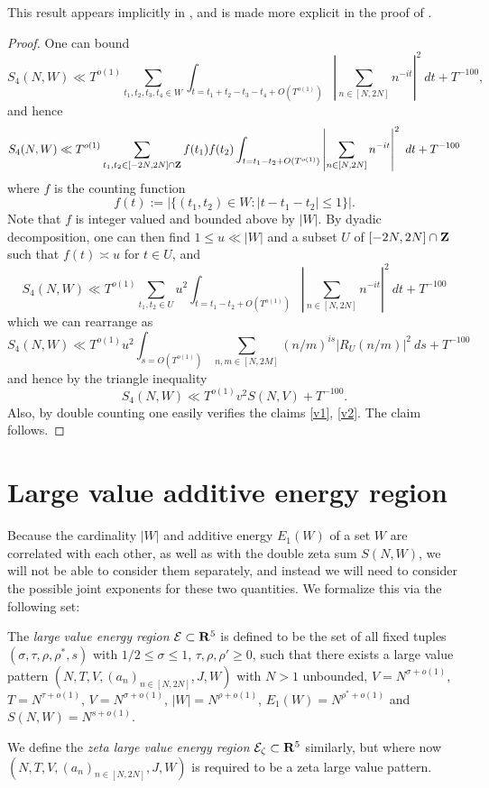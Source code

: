 This result appears implicitly in \cite[p. 229]{heath_brown_consecutive_II}, and is made more explicit in the proof of \cite[Lemma 11.6]{guth-maynard}.

\begin{proof} One can bound
    $$ S_4(N,W) \ll T^{o(1)} \sum_{t_1,t_2,t_3,t_4 \in W} \int_{t = t_1+t_2-t_3-t_4+O(T^{o(1)})} \left|\sum_{n \in [N,2N]} n^{-it}\right|^2\ dt + T^{-100},$$
    and hence
    $$ S_4(N,W) \ll T^{o(1)} \sum_{t_1,t_2 \in [-2N,2N] \cap \mathbf{Z}} f(t_1) f(t_2) \int_{t = t_1-t_2+O(T^{o(1)})} \left|\sum_{n \in [N,2N]} n^{-it}\right|^2\ dt + T^{-100}$$
where $f$ is the counting function
$$ f(t) := |\{ (t_1,t_2) \in W: |t-t_1-t_2| \leq 1 \}|.$$
Note that $f$ is integer valued and bounded above by $|W|$. By dyadic decomposition, one can then find $1 \leq u \ll |W|$ and a subset $U$ of $[-2N,2N] \cap \mathbf{Z}$ such that $f(t) \asymp u$ for $t \in U$, and
$$ S_4(N,W) \ll T^{o(1)} \sum_{t_1,t_2 \in U} u^2 \int_{t = t_1-t_2+O(T^{o(1)})} \left|\sum_{n \in [N,2N]} n^{-it} \right|^2\ dt + T^{-100}$$
which we can rearrange as
$$ S_4(N,W) \ll T^{o(1)} u^2 \int_{s = O(T^{o(1)})} \sum_{n,m \in [N,2M]} (n/m)^{is} |R_U(n/m)|^2\ ds + T^{-100}$$
and hence by the triangle inequality
$$ S_4(N,W) \ll T^{o(1)} v^2 S(N,V) + T^{-100}.$$
Also, by double counting one easily verifies the claims \eqref{v1}, \eqref{v2}.  The claim follows.
\end{proof}


\section{Large value additive energy region}

Because the cardinality $|W|$ and additive energy $E_1(W)$ of a set $W$ are correlated with each other, as well as with the double zeta sum $S(N,W)$, we will not be able to consider them separately, and instead we will need to consider the possible joint exponents for these two quantities.  We formalize this via the following set:

\begin{definition}\label{lv-edef} The \emph{large value energy region} $\mathcal{E} \subset \mathbf{R}^5$ is defined to be the set of all fixed tuples $(\sigma,\tau,\rho,\rho^*,s)$ with $1/2 \leq \sigma \leq 1$, $\tau, \rho, \rho' \geq 0$, such that there exists a large value pattern $(N,T,V,(a_n)_{n \in [N,2N]},J,W)$ with $N>1$ unbounded, $V = N^{\sigma+o(1)}$, $T = N^{\tau+o(1)}$, $V = N^{\sigma+o(1)}$, $|W| = N^{\rho+o(1)}$, $E_1(W) = N^{\rho^*+o(1)}$ and $S(N,W) = N^{s+o(1)}$.

We define the \emph{zeta large value energy region} $\mathcal{E}_\zeta \subset \mathbf{R}^5$ similarly, but where now $(N,T,V,(a_n)_{n \in [N,2N]},J,W)$ is required to be a zeta large value pattern.
\end{definition}

